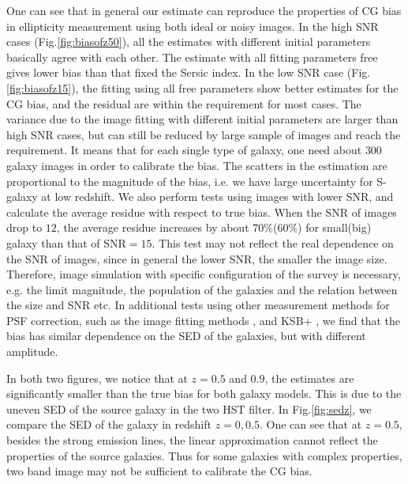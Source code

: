 \documentclass[useAMS,usenatbib]{mnras}
\begin{document}
One can see that in general our estimate can reproduce the properties
of CG bias in ellipticity measurement using both ideal or noisy
images.  In the high SNR cases (Fig.\ref{fig:biasofz50}), all the
estimates with different initial parameters basically agree with each
other. The estimate with all fitting parameters free gives lower bias
than that fixed the Sersic index. In the low SNR case
(Fig.\ref{fig:biasofz15}), the fitting using all free parameters show
better estimates for the CG bias, and the residual are within the
requirement for most cases. The variance due to the image fitting with
different initial parameters are larger than high SNR cases, but can
still be reduced by large sample of images and reach the requirement.
It means that for each single type of galaxy, one need about $300$
galaxy images in order to calibrate the bias. The scatters in the
estimation are proportional to the magnitude of the bias, i.e. we have
large uncertainty for S-galaxy at low redshift. We also perform tests
using images with lower SNR, and calculate the average residue with
respect to true bias. When the SNR of images drop to $12$, the average
residue increases by about $70\%$($60\%$) for small(big) galaxy than
that of SNR$=15$. This test may not reflect the real dependence on the
SNR of images, since in general the lower SNR, the smaller the image
size. Therefore, image simulation with specific configuration of the
survey is necessary, e.g. the limit magnitude, the population of the
galaxies and the relation between the size and SNR etc.
In additional tests using other measurement methods for PSF
correction, such as the image fitting methods
\citep[e.g.][]{2007MNRAS.382..315M,2008MNRAS.390..149K,2013MNRAS.429.2858M},
and KSB+ \citep[e.g.][]{1998ApJ...504..636H,2006MNRAS.368.1323H}, we
find that the bias has similar dependence on the SED of the galaxies,
but with different amplitude.

In both two figures, we notice that at $z=0.5$ and $0.9$, the estimates are
significantly smaller than the true bias for both galaxy models. This is
due to the uneven SED of the source galaxy in the two HST filter. In
Fig.\ref{fig:sedz}, we compare the SED of the galaxy in redshift
$z=0,0.5$. One can see that at $z=0.5$, besides the strong emission
lines, the linear approximation cannot reflect the properties of the
source galaxies. Thus for some galaxies with complex properties, two band
image may not be sufficient to calibrate the CG bias.
\end{document}
